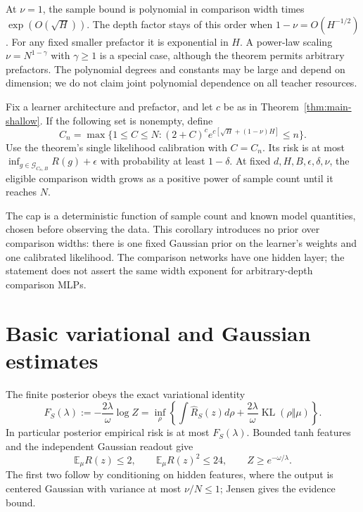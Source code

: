 \documentclass[11pt]{article}
\newcommand{\E}{\mathbb E}\newcommand{\R}{\mathbb R}\newcommand{\KL}{\operatorname{KL}}\newcommand{\op}{\mathrm{op}}
\begin{document}
At $\nu=1$, the sample bound is polynomial in comparison width times $\exp(O(\sqrt H))$. The depth factor stays of this order when $1-\nu=O(H^{-1/2})$. For any fixed smaller prefactor it is exponential in $H$. A power-law scaling $\nu=N^{1-\gamma}$ with $\gamma\ge1$ is a special case, although the theorem permits arbitrary prefactors. The polynomial degrees and constants may be large and depend on dimension; we do not claim joint polynomial dependence on all teacher resources.

\begin{corollary}
\label{cor:sample-cap}
Fix a learner architecture and prefactor, and let $c$ be as in Theorem~\ref{thm:main-shallow}. If the following set is nonempty, define
\[
 C_n=\max\{1\le C\le N:
          (2+C)^c e^{c[\sqrt H+(1-\nu)H]}\le n\}.
\]
Use the theorem's single likelihood calibration with $C=C_n$. Its risk is at most
$\inf_{g\in\mathcal G_{C_n,B}}R(g)+\epsilon$ with probability at least $1-\delta$. At fixed $d,H,B,\epsilon,\delta,\nu$, the eligible comparison width grows as a positive power of sample count until it reaches $N$.
\end{corollary}

The cap is a deterministic function of sample count and known model quantities, chosen before observing the data. This corollary introduces no prior over comparison widths: there is one fixed Gaussian prior on the learner's weights and one calibrated likelihood. The comparison networks have one hidden layer; the statement does not assert the same width exponent for arbitrary-depth comparison MLPs.

\section{Basic variational and Gaussian estimates}
The finite posterior obeys the exact variational identity
\begin{equation}
 F_S(\lambda):=-\frac{2\lambda}{\omega}\log Z
 =\inf_\rho\left\{\int\widehat R_S(z)d\rho
                     +\frac{2\lambda}{\omega}\KL(\rho\Vert\mu)\right\}.
 \label{eq:variational}
\end{equation}
In particular posterior empirical risk is at most $F_S(\lambda)$. Bounded tanh features and the independent Gaussian readout give
\[
 \E_\mu R(z)\le2,\qquad \E_\mu R(z)^2\le24,
 \qquad Z\ge e^{-\omega/\lambda}.
\]
The first two follow by conditioning on hidden features, where the output is centered Gaussian with variance at most $\nu/N\le1$; Jensen gives the evidence bound.
\end{document}
